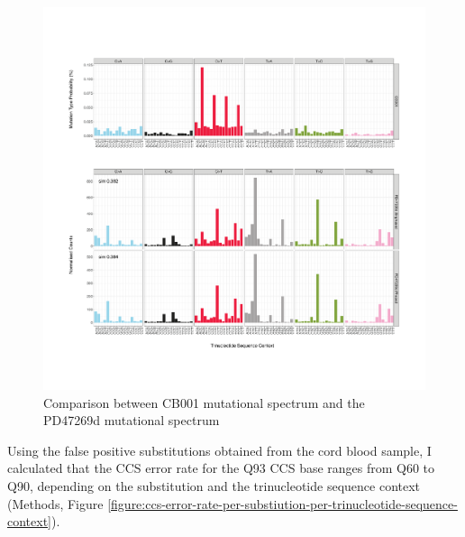 \begin{figure}[htbp!]
\caption{Comparison between CB001 mutational spectrum and the PD47269d mutational spectrum}
\label{figure:PD47269d}
\includegraphics[width=\textwidth]{Vector/hg19.CB001.PD47269d.pdf}
\end{figure}

Using the false positive substitutions obtained from the cord blood sample, I calculated that the CCS error rate for the Q93 CCS base ranges from Q60 to Q90, depending on the substitution and the trinucleotide sequence context (Methods, Figure \ref{figure:ccs-error-rate-per-substiution-per-trinucleotide-sequence-context}).

